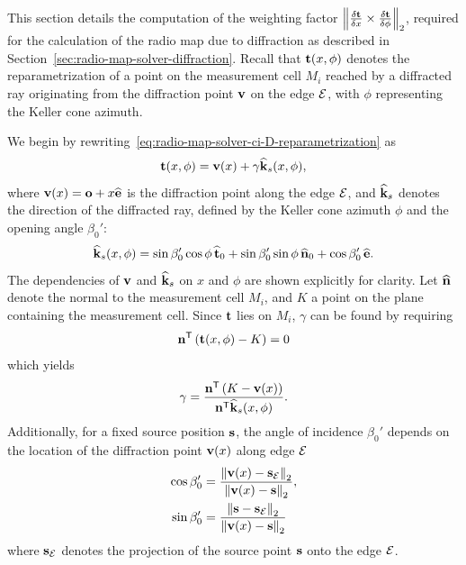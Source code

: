 This section details the computation of the weighting factor $\left\lVert \frac{\delta \mathbf{t}}{\delta x} \times \frac{\delta \mathbf{t}}{\delta \phi} \right\rVert_2$, required for the calculation of the radio map due to diffraction as described in Section~\ref{sec:radio-map-solver-diffraction}.
Recall that $\mathbf{t}(x, \phi)$ denotes the reparametrization of a point on the measurement cell $M_i$ reached by a diffracted ray originating from the diffraction point $\mathbf{v}$ on the edge ${\cal E}$, with $\phi$ representing the Keller cone azimuth.

We begin by rewriting~\eqref{eq:radio-map-solver-ci-D-reparametrization} as
\begin{equation}
    \label{eq:diffraction-radio-map-weighting-factor-reparametrization}
    \mathbf{t}(x,\phi) = \mathbf{v}(x) + \gamma \widehat{\mathbf{k}}_s(x, \phi),
\end{equation}
where $\mathbf{v}(x) = \mathbf{o} + x \widehat{\mathbf{e}}$ is the diffraction point along the edge ${\cal E}$, and $\widehat{\mathbf{k}}_s$ denotes the direction of the diffracted ray, defined by the Keller cone azimuth $\phi$ and the opening angle $\beta_0'$:
\begin{equation}
    \label{eq:diffraction-radio-map-weighting-factor-kv-s}
    \widehat{\mathbf{k}}_s(x, \phi) = \sin\beta_0' \cos\phi\, \widehat{\mathbf{t}}_0 + \sin\beta_0' \sin\phi\, \widehat{\mathbf{n}}_0 + \cos\beta_0'\, \widehat{\mathbf{e}}.
\end{equation}
The dependencies of $\mathbf{v}$ and $\widehat{\mathbf{k}}_s$ on $x$ and $\phi$ are shown explicitly for clarity.
Let $\widehat{\mathbf{n}}$ denote the normal to the measurement cell $M_i$, and $K$ a point on the plane containing the measurement cell.
Since $\mathbf{t}$ lies on $M_i$, $\gamma$ can be found by requiring
\begin{equation}
    \mathbf{n}^{\mathsf{T}} \left( \mathbf{t}(x, \phi) - K \right) = 0
\end{equation}
which yields
\begin{equation}
    \label{eq:diffraction-radio-map-weighting-factor-gamma}
    \gamma = \frac{\mathbf{n}^{\mathsf{T}} \left( K - \mathbf{v}(x) \right)}{\mathbf{n}^{\mathsf{T}} \widehat{\mathbf{k}}_s(x, \phi)}.
\end{equation}
Additionally, for a fixed source position $\mathbf{s}$, the angle of incidence $\beta_0'$ depends on the location of the diffraction point $\mathbf{v}(x)$ along edge ${\cal E}$
\begin{equation}
    \begin{aligned}
        \cos\beta_0' &= \frac{\left\lVert\mathbf{v}(x) - \mathbf{s}_{{\cal E}}\right\rVert_2}{\left\lVert\mathbf{v}(x) - \mathbf{s}\right\rVert_2}, \\
        \sin\beta_0' &= \frac{\left\lVert\mathbf{s} - \mathbf{s}_{{\cal E}}\right\rVert_2}{\left\lVert\mathbf{v}(x) - \mathbf{s}\right\rVert_2}
    \end{aligned}
    \label{eq:diffraction-radio-map-weighting-factor-beta-0}
\end{equation}
where $\mathbf{s}_{{\cal E}}$ denotes the projection of the source point $\mathbf{s}$ onto the edge ${\cal E}$.

